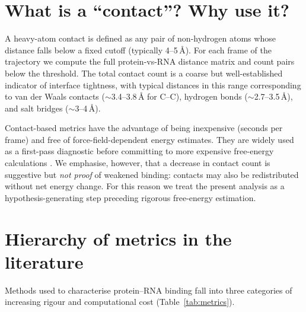 \documentclass[11pt,a4paper]{article}
\begin{document}
\section{What is a ``contact''? Why use it?}
\label{sec:contact}

A heavy-atom contact is defined as any pair of non-hydrogen atoms whose
distance falls below a fixed cutoff (typically 4--5\,\si{\angstrom}). For
each frame of the trajectory we compute the full protein-vs-RNA distance
matrix and count pairs below the threshold. The total contact count is a
coarse but well-established indicator of interface tightness, with typical
distances in this range corresponding to van der Waals contacts
($\sim$3.4--3.8\,\si{\angstrom} for C--C), hydrogen bonds
($\sim$2.7--3.5\,\si{\angstrom}), and salt bridges ($\sim$3--4\,\si{\angstrom}).

Contact-based metrics have the advantage of being inexpensive
(seconds per frame) and free of force-field-dependent energy estimates.
They are widely used as a first-pass diagnostic before committing to
more expensive free-energy calculations \citep{Kruse2017}. We emphasise,
however, that a decrease in contact count is suggestive but \emph{not
proof} of weakened binding: contacts may also be redistributed without
net energy change. For this reason we treat the present analysis as a
hypothesis-generating step preceding rigorous free-energy estimation.

\section{Hierarchy of metrics in the literature}
\label{sec:metrics}

Methods used to characterise protein--RNA binding fall into three
categories of increasing rigour and computational cost
(Table~\ref{tab:metrics}).
\end{document}
